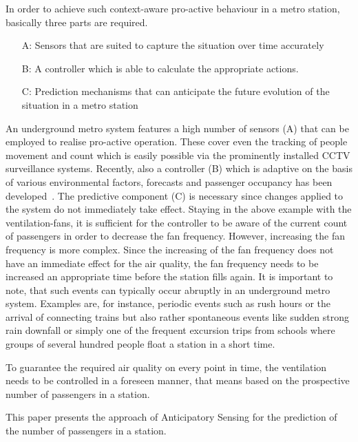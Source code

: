 In order to achieve such context-aware pro-active behaviour in a metro station, basically three parts are required. 
\begin{enumerate}
 \item[A:] Sensors that are suited to capture the situation over time accurately
 \item[B:] A controller which is able to calculate the appropriate actions.
 \item[C:] Prediction mechanisms that can anticipate the future evolution of the situation in a metro station
\end{enumerate}
An underground metro system features a high number of sensors (A) that can be employed to realise pro-active operation.
These cover even the tracking of people movement and count which is easily possible via the prominently installed CCTV surveillance systems.
Recently, also a controller (B) which is adaptive on the basis of various environmental factors, forecasts and passenger occupancy has been developed~\cite{guo_intelligent_2013}.
The predictive component (C) is necessary since changes applied to the system do not immediately take effect. 
Staying in the above example with the ventilation-fans, it is sufficient for the controller to be aware of the current count of passengers in order to decrease the fan frequency. 
However, increasing the fan frequency is more complex. 
Since the increasing of the fan frequency does not have an immediate effect for the air quality, the fan frequency needs to be increased an appropriate time before the station fills again. 
It is important to note, that such events can typically occur abruptly in an underground metro system. 
Examples are, for instance, periodic events such as rush hours or the arrival of connecting trains but also rather spontaneous events like sudden strong rain downfall or simply one of the frequent excursion trips from schools where groups of several hundred people float a station in a short time. 

To guarantee the required air quality on every point in time, the ventilation needs to be controlled in a foreseen manner, that means based on the prospective number of passengers in a station.

This paper presents the approach of Anticipatory Sensing for the prediction of the number of passengers in a station.

